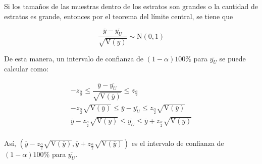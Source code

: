 \documentclass[12pt, fleqn]{article}
\newcommand{\V}[1]{\mathrm{V} \left( #1 \right)}
\begin{document}
    Si los tamaños de las muestras dentro de los estratos son grandes o la cantidad de estratos es grande, entonces por el teorema del límite central, se tiene que 

    \begin{equation*}
        \dfrac{\overline{y} - \overline{y_{U}}}{\sqrt{\V{\overline{y}}}} \sim \mathrm{N} (0,1)
    \end{equation*}

    De esta manera, un intervalo de confianza de $ (1 - \alpha) 100 \% $ para $ \overline{y_{U}} $ se puede calcular como:

    \begin{align*}
        -z_{\frac{\alpha}{2}} \leq \dfrac{\overline{y} - \overline{y_{U}}}{\sqrt{\V{\overline{y}}}} \leq z_{\frac{\alpha}{2}} \\
        -z_{\frac{\alpha}{2}} \sqrt{\V{\overline{y}}} \leq \overline{y} - \overline{y_{U}} \leq z_{\frac{\alpha}{2}} \sqrt{\V{\overline{y}}} \\
        \overline{y} - z_{\frac{\alpha}{2}} \sqrt{\V{\overline{y}}} \leq \overline{y_{U}} \leq \overline{y} + z_{\frac{\alpha}{2}} \sqrt{\V{\overline{y}}} \\
    \end{align*}

    Así, $ \left( \displaystyle \overline{y} - z_{\frac{\alpha}{2}} \sqrt{\V{\overline{y}}}, \overline{y} + z_{\frac{\alpha}{2}} \sqrt{\V{\overline{y}}} \right) $ es el intervalo de confianza de $ (1 - \alpha) 100 \% $ para $ \overline{y_{U}} $.
\end{document}
